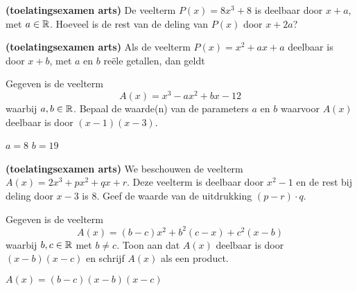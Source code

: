 \documentclass{ximera}
\begin{document}

\begin{exercise}
{\bf (toelatingsexamen arts)}
De veelterm $P(x) = 8x^3 + 8$ is deelbaar door $x+a$, met $a \in \mathbb{R}$. Hoeveel is de rest van de deling van $P(x)$ door $x+2a$?
\begin{multipleChoice}
\end{multipleChoice}
\end{exercise}

\begin{exercise}
{\bf (toelatingsexamen arts)}
Als de veelterm $P(x) = x^2 + ax + a$ deelbaar is door $x+b$, met $a$ en $b$ reële getallen, dan geldt
\begin{multipleChoice}
\end{multipleChoice}
\end{exercise}

\begin{exercise}
Gegeven is de veelterm
\[
A(x) = x^3 - ax^2 + bx - 12
\]
waarbij $a,b \in \mathbb{R}$. Bepaal de waarde(n) van de parameters $a$ en $b$ waarvoor $A(x)$ deelbaar is door $(x-1)(x-3)$. 

\begin{uitkomst} $a = 8$  $b = 19$ \end{uitkomst}
\end{exercise}

\begin{exercise}
{\bf (toelatingsexamen arts)}
We beschouwen de veelterm $A(x) = 2x^3 + px^2 + qx + r$. Deze veelterm is deelbaar door $x^2 - 1$ en de rest bij deling door $x-3$ is $8$. Geef de waarde van de uitdrukking $(p-r)\cdot q$.
\begin{multipleChoice}
\end{multipleChoice}
\end{exercise}

\begin{exercise}
Gegeven is de veelterm
\[
A(x) = (b-c)x^2 + b^2(c-x) + c^2(x-b)
\]
waarbij $b,c \in \mathbb{R}$ met $b \neq c$. Toon aan dat $A(x)$ deelbaar is door $(x-b)(x-c)$ en schrijf $A(x)$ als een product. 
\begin{uitkomst} \( A(x) = (b-c)(x-b)(x-c) \) \end{uitkomst}
\end{exercise}
\end{document}

